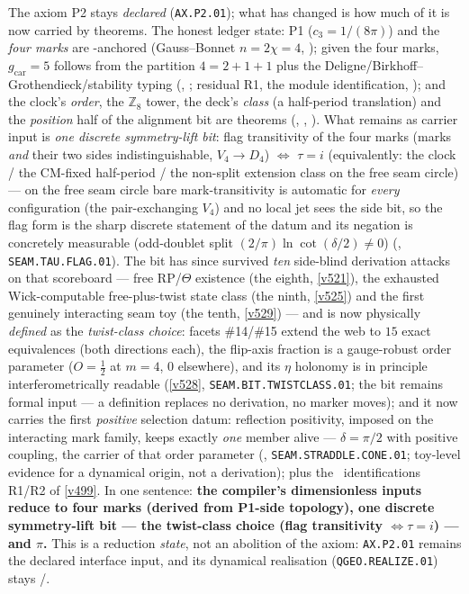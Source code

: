 \documentclass[11pt,a4paper]{article}
\newcommand{\gcar}{g_{\mathrm{car}}}
\newcommand{\cthree}{c_3}
\newcommand{\Z}{\mathbb{Z}}
\theoremstyle{definition}
\begin{document}
\begin{keybox}
The axiom P2 stays \emph{declared} (\texttt{AX.P2.01}); what has changed is how much of it is now
carried by theorems. The honest ledger state: P1 ($\cthree=1/(8\pi)$) and the \emph{four marks} are
\mE-anchored (Gauss--Bonnet $n=2\chi=4$, ); given the four marks,
$\gcar=5$ follows from the partition $4=2{+}1{+}1$ plus the Deligne/Birkhoff--Grothendieck/stability
typing (, ; residual
R1, the module identification, \mC); and the clock's \emph{order}, the $\Z_8$ tower, the deck's
\emph{class} (a half-period translation) and the \emph{position} half of the alignment bit are
theorems (, ,
). What remains as carrier input is \emph{one discrete
symmetry-lift bit}: flag transitivity of the four marks (marks \emph{and} their two sides
indistinguishable, $V_4\to D_4$) $\iff$ $\tau=i$ (equivalently: the clock / the CM-fixed
half-period / the non-split extension class on the free seam circle) --- on the free seam circle
bare mark-transitivity is automatic for \emph{every} configuration (the pair-exchanging $V_4$) and
no local jet sees the side bit, so the flag form is the sharp discrete statement of the datum and
its negation is concretely measurable (odd-doublet split $(2/\pi)\ln\cot(\delta/2)\neq0$)
(, \texttt{SEAM.TAU.FLAG.01}). The bit has since survived
\emph{ten} side-blind derivation attacks on that scoreboard --- free RP/$\Theta$ existence (the
eighth, \vref{v521}), the exhausted Wick-computable free-plus-twist state class (the ninth,
\vref{v525}) and the first genuinely interacting seam toy (the tenth, \vref{v529}) --- and is now
physically \emph{defined} as the \emph{twist-class choice}: facets \#14/\#15 extend the web to
$15$ exact equivalences (both directions each), the flip-axis fraction is a gauge-robust order
parameter ($O=\tfrac12$ at $m=4$, $0$ elsewhere), and its $\eta$ holonomy is in principle
interferometrically readable (\vref{v528}, \texttt{SEAM.BIT.TWISTCLASS.01}; the bit remains
formal input --- a definition replaces no derivation, no marker moves); and it now carries the
first \emph{positive} selection datum: reflection positivity, imposed on the interacting mark
family, keeps exactly \emph{one} member alive --- $\delta=\pi/2$ with positive coupling, the
carrier of that order parameter (,
\texttt{SEAM.STRADDLE.CONE.01}; toy-level evidence for a dynamical origin, not a derivation);
plus the \mC\
identifications R1/R2
of \vref{v499}. In one sentence: \textbf{the compiler's dimensionless inputs reduce to four marks
(derived from P1-side topology), one discrete symmetry-lift bit --- the twist-class choice (flag
transitivity $\iff\tau=i$) --- and $\pi$.} This is a reduction \emph{state}, not an abolition of
the axiom: \texttt{AX.P2.01} remains the declared interface input, and its dynamical realisation
(\texttt{QGEO.REALIZE.01}) stays \mC/\mO.
\end{keybox}
\end{document}
